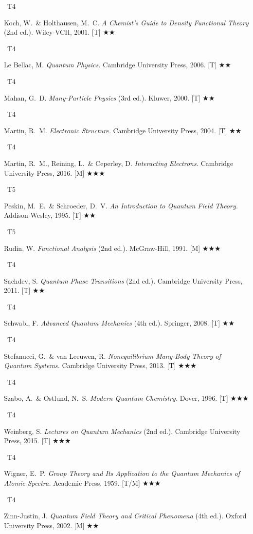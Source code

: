 \documentclass[11pt,a4paper]{article}
\newcommand{\tierbadge}[2]{\colorbox{#1}{\small\bfseries\color{white}\strut\ #2\ }}
\newcommand{\essential}{$\bigstar\bigstar\bigstar$}
\newcommand{\recommended}{$\bigstar\bigstar$}
\begin{document}
\begin{tcolorbox}[catbox]
\begin{enumerate}[leftmargin=2.5em,label=\textbf{[C\arabic*]},itemsep=3pt]
  \item \tierbadge{t4orange}{T4} Koch, W.\ \& Holthausen, M.~C. \textit{A Chemist's Guide to Density Functional Theory} (2nd ed.). Wiley-VCH, 2001. [T] \recommended
  \item \tierbadge{t4orange}{T4} Le Bellac, M. \textit{Quantum Physics.} Cambridge University Press, 2006. [T] \recommended
  \item \tierbadge{t4orange}{T4} Mahan, G.~D. \textit{Many-Particle Physics} (3rd ed.). Kluwer, 2000. [T] \recommended
  \item \tierbadge{t4orange}{T4} Martin, R.~M. \textit{Electronic Structure.} Cambridge University Press, 2004. [T] \recommended
  \item \tierbadge{t4orange}{T4} Martin, R.~M., Reining, L.\ \& Ceperley, D. \textit{Interacting Electrons.} Cambridge University Press, 2016. [M] \essential
  \item \tierbadge{t5red}{T5} Peskin, M.~E.\ \& Schroeder, D.~V. \textit{An Introduction to Quantum Field Theory.} Addison-Wesley, 1995. [T] \recommended
  \item \tierbadge{t5red}{T5} Rudin, W. \textit{Functional Analysis} (2nd ed.). McGraw-Hill, 1991. [M] \essential
  \item \tierbadge{t4orange}{T4} Sachdev, S. \textit{Quantum Phase Transitions} (2nd ed.). Cambridge University Press, 2011. [T] \recommended
  \item \tierbadge{t4orange}{T4} Schwabl, F. \textit{Advanced Quantum Mechanics} (4th ed.). Springer, 2008. [T] \recommended
  \item \tierbadge{t4orange}{T4} Stefanucci, G.\ \& van Leeuwen, R. \textit{Nonequilibrium Many-Body Theory of Quantum Systems.} Cambridge University Press, 2013. [T] \essential
  \item \tierbadge{t4orange}{T4} Szabo, A.\ \& Ostlund, N.~S. \textit{Modern Quantum Chemistry.} Dover, 1996. [T] \essential
  \item \tierbadge{t4orange}{T4} Weinberg, S. \textit{Lectures on Quantum Mechanics} (2nd ed.). Cambridge University Press, 2015. [T] \essential
  \item \tierbadge{t4orange}{T4} Wigner, E.~P. \textit{Group Theory and Its Application to the Quantum Mechanics of Atomic Spectra.} Academic Press, 1959. [T/M] \essential
  \item \tierbadge{t4orange}{T4} Zinn-Justin, J. \textit{Quantum Field Theory and Critical Phenomena} (4th ed.). Oxford University Press, 2002. [M] \recommended
\end{enumerate}
\end{tcolorbox}
\end{document}

